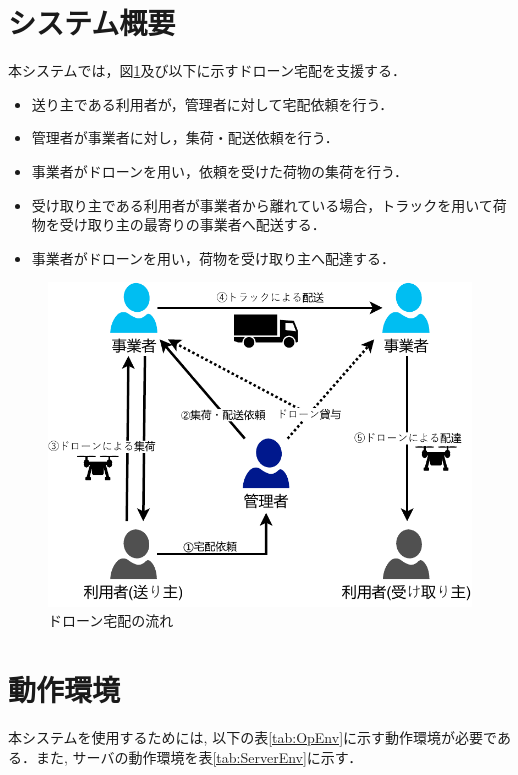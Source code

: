 \documentclass[a4paper, titlepage]{jsarticle}
\begin{document}
\section{システム概要}
本システムでは，図\ref{fig:overview_flow}及び以下に示すドローン宅配を支援する．
\begin{itemize}
  \item 送り主である利用者が，管理者に対して宅配依頼を行う．
  \item 管理者が事業者に対し，集荷・配送依頼を行う．
  \item 事業者がドローンを用い，依頼を受けた荷物の集荷を行う．
  \item 受け取り主である利用者が事業者から離れている場合，トラックを用いて荷物を受け取り主の最寄りの事業者へ配送する．
  \item 事業者がドローンを用い，荷物を受け取り主へ配達する．
\end{itemize}

\begin{figure}[H]
  \centering
  \includegraphics[width=0.6\linewidth]{fig/overview_flow.pdf}
  \caption{ドローン宅配の流れ}
  \label{fig:overview_flow}
\end{figure}

\section{動作環境}
本システムを使用するためには, 以下の表\ref{tab:OpEnv}に示す動作環境が必要である．また, サーバの動作環境を表\ref{tab:ServerEnv}に示す．
\end{document}
